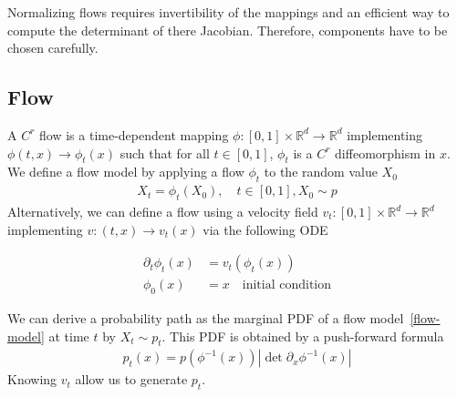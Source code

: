 \documentclass{article}
\begin{document}
\bigskip
Normalizing flows requires invertibility of the mappings and an efficient way to compute the determinant of there Jacobian. Therefore, components have to be chosen carefully.

\subsection{Flow}
A $C^r$ flow is a time-dependent mapping $\phi : [0,1]\times \mathbb{R}^d\rightarrow\mathbb{R}^d$ implementing $\phi(t,x) \rightarrow \phi_t(x)$ such that for all $t\in[0,1]$, $\phi_t$ is a $C^r$ diffeomorphism in $x$.
We define a flow model by applying a flow $\phi_t$ to the random value $X_0$
\begin{align}\label{flow-model}
    X_t=\phi_t(X_0), \quad t \in[0,1], X_0\sim p 
\end{align}
Alternatively, we can define a flow using a velocity field \(v_t:[0,1]\times\mathbb{R}^d\rightarrow \mathbb{R}^d\) implementing \(v:(t,x)\rightarrow v_t(x)\) via the following ODE 

\begin{align}\label{ODE}
    \partial_t \phi_t(x)&=v_t(\phi_t(x))\\
    \phi_0(x)&=x \quad \text{initial condition}
\end{align}

We can derive a probability path as the marginal PDF of a flow model~\ref{flow-model} at time \(t\) by \(X_t\sim p_t\). This PDF is obtained by a push-forward formula 
\begin{align}\label{pushforward}
    p_t(x) = p(\phi^{-1}(x))|\det \partial_x \phi^{-1}(x)|
\end{align} 
Knowing \(v_t\) allow us to generate \(p_t\).

\begin{comment}
\subsection{Continuous normalizing flow}

In continuous normalizing flow framework, \(f\) is obtained using a continuous dynamic 
\begin{align}
    \frac{\partial x_0}{\partial t} = f(x_t,t)
\end{align}
In continuous normalizing flows, \(f\) is obtzined by solving the neural ODE 
\begin{align}
    x_T = x_0+\int_0^T f(x_t,t)^{\theta} dt
\end{align}

CNF are trained by maximizing the log-likelyhood 
\begin{align}
    \mathcal{L}(\theta) = \mathbb{E}[\log p(x)]
\end{align}
\end{comment}
\end{document}
